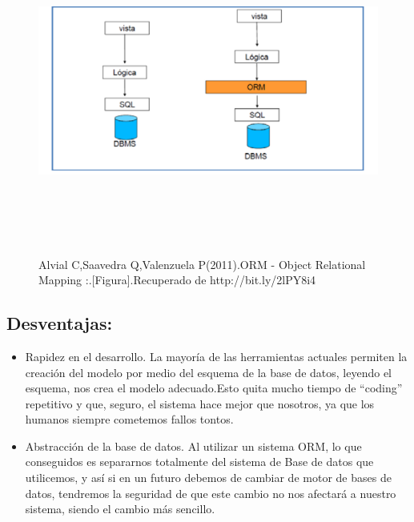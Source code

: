 \documentclass[preprint,12pt]{elsarticle}
\begin{document}
	\begin{figure}[H]
			\begin{center}
					\includegraphics[width=12cm,height=10cm]{./IMAGENES/ventajas}
			\end{center}
			Alvial C,Saavedra Q,Valenzuela P(2011).ORM - Object Relational Mapping :.[Figura].Recuperado de 
			http://bit.ly/2lPY8i4
		\end{figure}
\subsection{Desventajas:}
\begin{itemize}
\item Rapidez en el desarrollo. La mayoría de las herramientas actuales permiten la creación del modelo por
medio del esquema de la base de datos, leyendo el esquema, nos crea el modelo adecuado.Esto quita mucho tiempo de “coding” repetitivo y que, seguro, el sistema hace mejor que nosotros, ya que los humanos siempre cometemos fallos tontos. 
\item Abstracción de la base de datos. Al utilizar un sistema ORM, lo que conseguidos es separarnos totalmente del sistema de Base de datos que utilicemos, y así si en un futuro debemos de cambiar de motor de bases de datos, tendremos la seguridad de que este cambio no nos afectará a nuestro
sistema, siendo el cambio más sencillo. 
\end{itemize}
\end{document}
